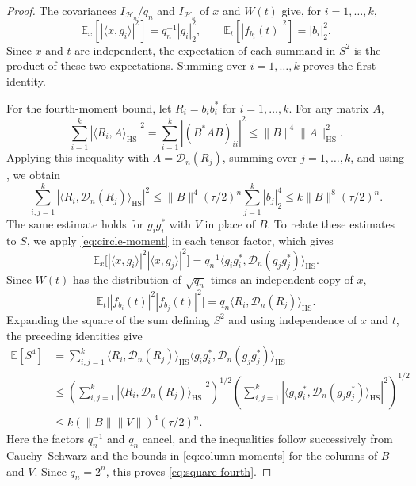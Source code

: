 \documentclass[11pt,a4paper,reqno]{amsart}
\theoremstyle{definition}
\newcommand{\norm}[1]{\lVert #1\rVert}
\numberwithin{equation}{section}
\begin{document}
\begin{proof}
The covariances $I_{\mathcal H_n}/q_n$ and $I_{\mathcal H_n}$ of $x$ and $W(t)$ give, for $i=1,\ldots,k$,
\begin{equation*}
 \mathbb E_x[|\langle x,g_i\rangle|^2]=q_n^{-1}|g_i|_2^2,
 \qquad \mathbb E_t[|f_{b_i}(t)|^2]=|b_i|_2^2.
\end{equation*}
Since $x$ and $t$ are independent, the expectation of each summand in $S^2$ is the product of these two expectations. Summing over $i=1,\ldots,k$ proves the first identity.

For the fourth-moment bound, let $R_i=b_ib_i^*$ for $i=1,\ldots,k$. For any matrix $A$,
\begin{equation*}
 \sum_{i=1}^k|\langle R_i,A\rangle_{\mathrm{HS}}|^2
 =\sum_{i=1}^k|(B^*AB)_{ii}|^2
 \leq\norm B^4\norm A_{\mathrm{HS}}^2.
\end{equation*}
Applying this inequality with $A=\mathcal D_n(R_j)$, summing over $j=1,\ldots,k$, and using , we obtain
\begin{equation}\label{eq:column-moments}
 \sum_{i,j=1}^k|\langle R_i,\mathcal D_n(R_j)\rangle_{\mathrm{HS}}|^2
 \leq\norm B^4(\tau/2)^n\sum_{j=1}^k|b_j|_2^4
 \leq k\norm B^8(\tau/2)^n.
\end{equation}
The same estimate holds for $g_ig_i^*$ with $V$ in place of $B$. To relate these estimates to $S$, we apply \eqref{eq:circle-moment} in each tensor factor, which gives
\begin{equation*}
 \mathbb E_x\bigl[|\langle x,g_i\rangle|^2|\langle x,g_j\rangle|^2\bigr]
 =q_n^{-1}\langle g_ig_i^*,
                     \mathcal D_n(g_jg_j^*)\rangle_{\mathrm{HS}}.
\end{equation*}
Since $W(t)$ has the distribution of $\sqrt{q_n}$ times an independent copy of $x$,
\begin{equation*}
 \mathbb E_t\bigl[|f_{b_i}(t)|^2|f_{b_j}(t)|^2\bigr]
 =q_n\langle R_i,\mathcal D_n(R_j)\rangle_{\mathrm{HS}}.
\end{equation*}
Expanding the square of the sum defining $S^2$ and using independence of $x$ and $t$, the preceding identities give
\begin{equation*}
 \begin{aligned}
 \mathbb E[S^4]
 &=\sum_{i,j=1}^k\langle R_i,\mathcal D_n(R_j)\rangle_{\mathrm{HS}}
       \langle g_ig_i^*,\mathcal D_n(g_jg_j^*)\rangle_{\mathrm{HS}}\\
 &\leq\left(\sum_{i,j=1}^k|\langle R_i,\mathcal D_n(R_j)\rangle_{\mathrm{HS}}|^2\right)^{1/2}
       \left(\sum_{i,j=1}^k|\langle g_ig_i^*,\mathcal D_n(g_jg_j^*)\rangle_{\mathrm{HS}}|^2\right)^{1/2}\\
 &\leq k(\norm B\norm V)^4(\tau/2)^n.
 \end{aligned}
\end{equation*}
Here the factors $q_n^{-1}$ and $q_n$ cancel, and the inequalities follow successively from Cauchy--Schwarz and the bounds in \eqref{eq:column-moments} for the columns of $B$ and $V$. Since $q_n=2^n$, this proves \eqref{eq:square-fourth}.
\end{proof}
\end{document}
